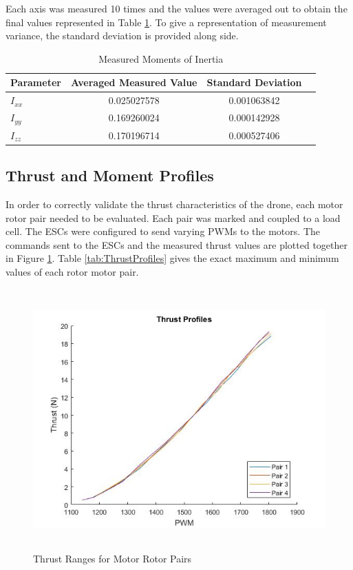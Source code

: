 	Each axis was measured 10 times and the values were averaged out to obtain the final values represented in Table \ref{tab:MomentOfInertia}. To give a representation of measurement variance, the standard deviation is provided along side.
	
	\begin{table}[H]
		\centering
		\begin{tabular}{l | c | c | c |}
			Parameter & Averaged Measured Value & Standard Deviation\\
			\hline\hline
			$I_{xx}$ & 0.025027578 & 0.001063842\\
			$I_{yy}$ & 0.169260024 & 0.000142928\\
			$I_{zz}$ & 0.170196714 & 0.000527406\\
		\end{tabular}
		\label{tab:MomentOfInertia}
		\caption{Measured Moments of Inertia}
	\end{table}
	
	\subsection{Thrust and Moment Profiles}
	In order to correctly validate the thrust characteristics of the drone, each motor rotor pair needed to be evaluated. Each pair was marked and coupled to a load cell. The ESCs were configured to send varying PWMs to the motors. The commands sent to the ESCs and the measured thrust values are plotted together in Figure \ref{IM_ThrustProfiles}. Table \ref{tab:ThrustProfiles} gives the exact maximum and minimum values of each rotor motor pair. 
	
	\begin{figure}[H]
		\centering
		\includegraphics[height = 10cm]{../Design/Mechanical/ThrustProfiles/thrustprofiles.jpg}
		\caption{Thrust Ranges for Motor Rotor Pairs}
		\label{IM_ThrustProfiles}
	\end{figure}
	
